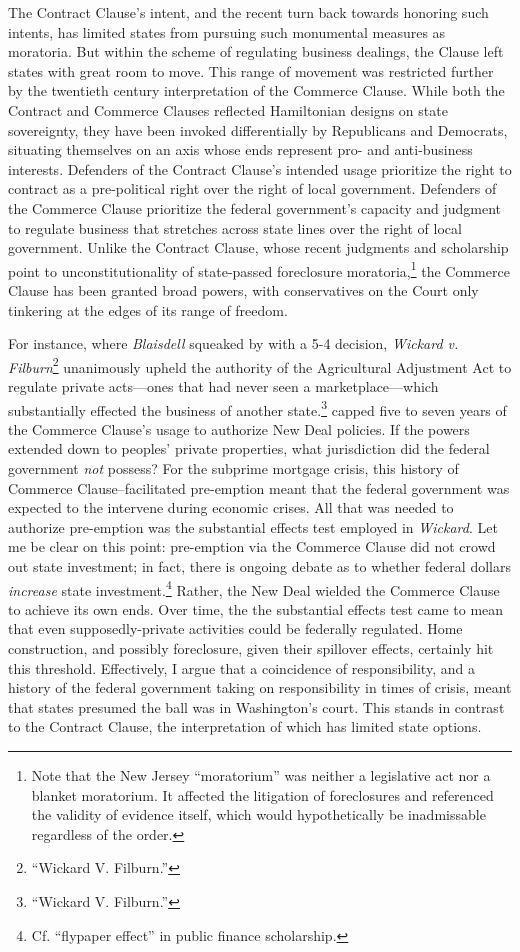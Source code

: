 \documentclass[
]{article}
\let\rmarkdownfootnote\footnote%
\def\footnote{\protect\rmarkdownfootnote}
\begin{document}
The Contract Clause's intent, and the recent turn back towards honoring
such intents, has limited states from pursuing such monumental measures
as moratoria. But within the scheme of regulating business dealings, the
Clause left states with great room to move. This range of movement was
restricted further by the twentieth century interpretation of the
Commerce Clause. While both the Contract and Commerce Clauses reflected
Hamiltonian designs on state sovereignty, they have been invoked
differentially by Republicans and Democrats, situating themselves on an
axis whose ends represent pro- and anti-business interests. Defenders of
the Contract Clause's intended usage prioritize the right to contract as
a pre-political right over the right of local government. Defenders of
the Commerce Clause prioritize the federal government's capacity and
judgment to regulate business that stretches across state lines over the
right of local government. Unlike the Contract Clause, whose recent
judgments and scholarship point to unconstitutionality of state-passed
foreclosure moratoria,\footnote{Note that the New Jersey ``moratorium''
  was neither a legislative act nor a blanket moratorium. It affected
  the litigation of foreclosures and referenced the validity of evidence
  itself, which would hypothetically be inadmissable regardless of the
  order.} the Commerce Clause has been granted broad powers, with
conservatives on the Court only tinkering at the edges of its range of
freedom.

For instance, where \emph{Blaisdell} squeaked by with a 5-4 decision,
\emph{Wickard v. Filburn}\footnote{``Wickard V. Filburn.''} unanimously
upheld the authority of the Agricultural Adjustment Act to regulate
private acts---ones that had never seen a marketplace---which
substantially effected the business of another state.\footnote{``Wickard
  V. Filburn.''} capped five to seven years of the Commerce Clause's
usage to authorize New Deal policies. If the powers extended down to
peoples' private properties, what jurisdiction did the federal
government \emph{not} possess? For the subprime mortgage crisis, this
history of Commerce Clause--facilitated pre-emption meant that the
federal government was expected to the intervene during economic crises.
All that was needed to authorize pre-emption was the substantial effects
test employed in \emph{Wickard}. Let me be clear on this point:
pre-emption via the Commerce Clause did not crowd out state investment;
in fact, there is ongoing debate as to whether federal dollars
\emph{increase} state investment.\footnote{Cf. ``flypaper effect'' in
  public finance scholarship.} Rather, the New Deal wielded the Commerce
Clause to achieve its own ends. Over time, the the substantial effects
test came to mean that even supposedly-private activities could be
federally regulated. Home construction, and possibly foreclosure, given
their spillover effects, certainly hit this threshold. Effectively, I
argue that a coincidence of responsibility, and a history of the federal
government taking on responsibility in times of crisis, meant that
states presumed the ball was in Washington's court. This stands in
contrast to the Contract Clause, the interpretation of which has limited
state options.
\end{document}
